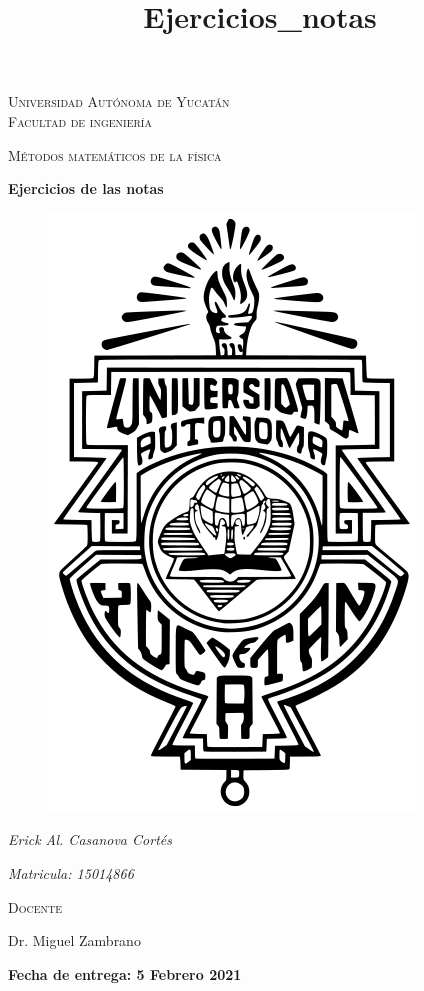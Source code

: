 \documentclass[11pt]{report}
\theoremstyle{plain}
\theoremstyle{definition}
\begin{document}
\begin{titlepage}
\title{Ejercicios_notas}


	\centering
	{\scshape\LARGE Universidad Autónoma de Yucatán  \\ Facultad de ingeniería\par}
	\vspace{1cm}
	{\scshape\Large Métodos matemáticos de la física\par}
	\vspace{1.5cm}
	{\huge\bfseries Ejercicios de las notas\par}
	\vspace{0.7cm}
	{\begin{figure}[!h]
	\centering
    \includegraphics[scale=0.3]{UADY.png}
	\end{figure}}
	\vspace{0.7cm}
	{\Large\itshape Erick Al. Casanova Cortés\par}
	{\Large\itshape Matricula: 15014866\par}
	\vfill
	{\scshape\Large Docente\par
	Dr. Miguel Zambrano\par}
	\vfill
	{\Large{\bfseries Fecha de entrega: 5 Febrero 2021} }

	\vfill
	
\end{titlepage}
\end{document}
